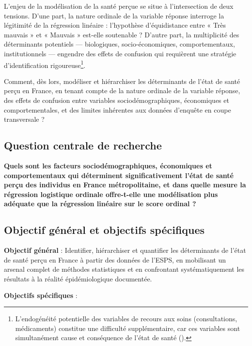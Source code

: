 \documentclass[11pt,a4paper]{memoirerecherche}
\begin{document}
L'enjeu de la modélisation de la santé perçue se situe à l'intersection de deux tensions. D'une part, la nature ordinale de la variable réponse interroge la légitimité de la régression linéaire : l'hypothèse d'équidistance entre « Très mauvais » et « Mauvais » est-elle soutenable ? D'autre part, la multiplicité des déterminants potentiels --- biologiques, socio-économiques, comportementaux, institutionnels --- engendre des effets de confusion qui requièrent une stratégie d'identification rigoureuse\footnote{L'endogénéité potentielle des variables de recours aux soins (consultations, médicaments) constitue une difficulté supplémentaire, car ces variables sont simultanément cause et conséquence de l'état de santé (\textcite{grossman1972}).}.

Comment, dès lors, modéliser et hiérarchiser les déterminants de l'état de santé perçu en France, en tenant compte de la nature ordinale de la variable réponse, des effets de confusion entre variables sociodémographiques, économiques et comportementales, et des limites inhérentes aux données d'enquête en coupe transversale ?

\hypertarget{question-centrale-de-recherche}{%
\subsection{Question centrale de recherche}\label{question-centrale-de-recherche}}

\textbf{Quels sont les facteurs sociodémographiques, économiques et comportementaux qui déterminent significativement l'état de santé perçu des individus en France métropolitaine, et dans quelle mesure la régression logistique ordinale offre-t-elle une modélisation plus adéquate que la régression linéaire sur le score ordinal ?}

\hypertarget{objectif-guxe9nuxe9ral-et-objectifs-spuxe9cifiques}{%
\subsection{Objectif général et objectifs spécifiques}\label{objectif-guxe9nuxe9ral-et-objectifs-spuxe9cifiques}}

\textbf{Objectif général} : Identifier, hiérarchiser et quantifier les déterminants de l'état de santé perçu en France à partir des données de l'ESPS, en mobilisant un arsenal complet de méthodes statistiques et en confrontant systématiquement les résultats à la réalité épidémiologique documentée.

\textbf{Objectifs spécifiques} :
\end{document}
